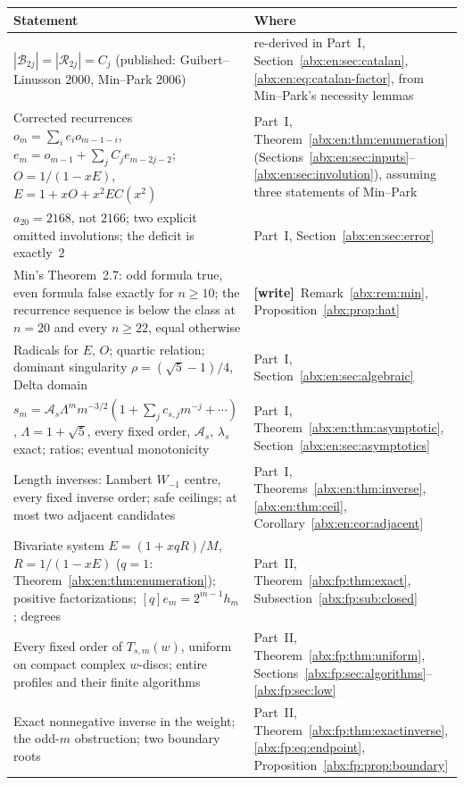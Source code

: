 \documentclass[11pt,letterpaper]{article}
\numberwithin{equation}{section}
\theoremstyle{remark}\newtheorem{remark}[theorem]{Remark}
\newcommand{\BB}{\mathcal B}
\newcommand{\RR}{\mathcal R}
\newcommand{\wtag}{\textup{\textbf{[write]}}}
\begin{document}
\begin{center}
\small
\begin{tabular}{@{}>{\raggedright\arraybackslash}p{} >{\raggedright\arraybackslash}p{}@{}}
\toprule
Statement & Where\\
\midrule
$|\BB_{2j}|=|\RR_{2j}|=C_j$ (published: Guibert--Linusson 2000, Min--Park 2006) & re-derived in Part~I, Section~\ref{abx:en:sec:catalan}, \eqref{abx:en:eq:catalan-factor}, from Min--Park's necessity lemmas\\
Corrected recurrences $o_m=\sum_ie_io_{m-1-i}$, $e_m=o_{m-1}+\sum_jC_je_{m-2j-2}$; $O=1/(1-xE)$, $E=1+xO+x^2EC(x^2)$ & Part~I, Theorem~\ref{abx:en:thm:enumeration} (Sections~\ref{abx:en:sec:inputs}--\ref{abx:en:sec:involution}), assuming three statements of Min--Park\\
$a_{20}=2168$, not $2166$; two explicit omitted involutions; the deficit is exactly~$2$ & Part~I, Section~\ref{abx:en:sec:error}\\
Min's Theorem~2.7: odd formula true, even formula false exactly for $n\ge10$; the recurrence sequence is below the class at $n=20$ and every $n\ge22$, equal otherwise & \wtag\ Remark~\ref{abx:rem:min}, Proposition~\ref{abx:prop:hat}\\
Radicals for $E$, $O$; quartic relation; dominant singularity $\rho=(\sqrt5-1)/4$, Delta domain & Part~I, Section~\ref{abx:en:sec:algebraic}\\
$s_m=\mathcal A_s\Lambda^mm^{-3/2}(1+\sum_jc_{s,j}m^{-j}+\cdots)$, $\Lambda=1+\sqrt5$, every fixed order, $\mathcal A_s$, $\lambda_s$ exact; ratios; eventual monotonicity & Part~I, Theorem~\ref{abx:en:thm:asymptotic}, Section~\ref{abx:en:sec:asymptotics}\\
Length inverses: Lambert $W_{-1}$ centre, every fixed inverse order; safe ceilings; at most two adjacent candidates & Part~I, Theorems~\ref{abx:en:thm:inverse}, \ref{abx:en:thm:ceil}, Corollary~\ref{abx:en:cor:adjacent}\\
Bivariate system $E=(1+xqR)/M$, $R=1/(1-xE)$ ($q=1$: Theorem~\ref{abx:en:thm:enumeration}); positive factorizations; $[q]e_m=2^{m-1}h_m$; degrees & Part~II, Theorem~\ref{abx:fp:thm:exact}, Subsection~\ref{abx:fp:sub:closed}\\
Every fixed order of $T_{s,m}(w)$, uniform on compact complex $w$-discs; entire profiles and their finite algorithms & Part~II, Theorem~\ref{abx:fp:thm:uniform}, Sections~\ref{abx:fp:sec:algorithms}--\ref{abx:fp:sec:low}\\
Exact nonnegative inverse in the weight; the odd-$m$ obstruction; two boundary roots & Part~II, Theorem~\ref{abx:fp:thm:exactinverse}, \eqref{abx:fp:eq:endpoint}, Proposition~\ref{abx:fp:prop:boundary}\\

\end{tabular}
\end{center}
\end{document}
